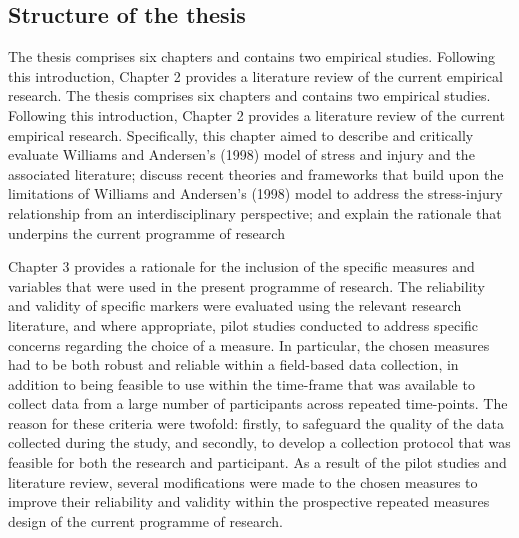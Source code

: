 \documentclass[man,floatsintext]{apa6}
\begin{document}
\hypertarget{structure-of-the-thesis}{%
\subsection{Structure of the thesis}\label{structure-of-the-thesis}}

The thesis comprises six chapters and contains two empirical studies.
Following this introduction, Chapter 2 provides a literature review of the current empirical research.
The thesis comprises six chapters and contains two empirical studies. Following this introduction, Chapter 2 provides a literature review of the current empirical research. Specifically, this chapter aimed to describe and critically evaluate Williams and Andersen's (1998) model of stress and injury and the associated literature; discuss recent theories and frameworks that build upon the limitations of Williams and Andersen's (1998) model to address the stress-injury relationship from an interdisciplinary perspective; and explain the rationale that underpins the current programme of research

Chapter 3 provides a rationale for the inclusion of the specific measures and variables that were used in the present programme of research.
The reliability and validity of specific markers were evaluated using the relevant research literature, and where appropriate, pilot studies conducted to address specific concerns regarding the choice of a measure.
In particular, the chosen measures had to be both robust and reliable within a field-based data collection, in addition to being feasible to use within the time-frame that was available to collect data from a large number of participants across repeated time-points. The reason for these criteria were twofold: firstly, to safeguard the quality of the data collected during the study, and secondly, to develop a collection protocol that was feasible for both the research and participant.
As a result of the pilot studies and literature review, several modifications were made to the chosen measures to improve their reliability and validity within the prospective repeated measures design of the current programme of research.
\end{document}
